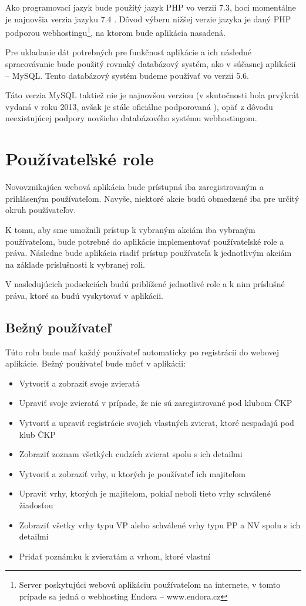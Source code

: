 Ako programovací jazyk bude použítý jazyk PHP vo verzii 7.3, hoci momentálne je najnovšia verzia jazyku 7.4 \cite{verzie-php}.
Dôvod výberu nižšej verzie jazyka je daný PHP podporou webhostingu\footnote{Server poskytujúci webovú aplikáciu používateľom na internete, v tomto prípade sa jedná o webhosting Endora -- www.endora.cz}, na ktorom bude aplikácia nasadená.

Pre ukladanie dát potrebných pre funkčnosť aplikácie a ich následné spracovávanie bude použitý rovnaký databázový systém, ako v súčasnej aplikácii -- MySQL. Tento databázový systém budeme používať vo verzii 5.6.

Táto verzia MySQL taktiež nie je najnovšou verziou (v skutočnosti bola prvýkrát vydaná v roku 2013, avšak je stále oficiálne podporovaná \cite{verzie-mysql}), opäť z dôvodu neexistujúcej podpory novšieho databázového systému webhostingom.

\pagebreak

\section{Používateľské role}\label{pouzivatelske-role}
Novovznikajúca webová aplikácia bude prístupná iba zaregistrovaným a prihláseným používateľom. Navyše, niektoré akcie budú obmedzené iba pre určitý okruh používateľov.

K tomu, aby sme umožnili prístup k vybraným akciám iba vybraným používateľom, bude potrebné do aplikácie implementovať používateľské role a práva. Následne bude aplikácia riadiť prístup používateľa k jednotlivým akciám na základe príslušnosti k vybranej roli.

V nasledujúcich podsekciách budú priblížené jednotlivé role a k nim príslušné práva, ktoré sa budú vyskytovať v aplikácii.

\subsection{Bežný používateľ}\label{bezny-pouzivatel}
Túto rolu bude mať každý používateľ automaticky po registrácii do webovej aplikácie. Bežný používateľ bude môcť v aplikácii: 

\begin{itemize}
	\item Vytvoriť a zobraziť svoje zvieratá
	\item Upraviť svoje zvieratá v prípade, že nie sú zaregistrované pod klubom ČKP
	\item Vytvoriť a upraviť registrácie svojich vlastných zvierat, ktoré nespadajú pod klub ČKP
	\item Zobraziť zoznam všetkých cudzích zvierat spolu s ich detailmi
	\item Vytvoriť a zobraziť vrhy, u ktorých je používateľ ich majiteľom
	\item Upraviť vrhy, ktorých je majitelom, pokiaľ neboli tieto vrhy schválené žiadosťou
	\item Zobraziť všetky vrhy typu VP alebo schválené vrhy typu PP a NV spolu s ich detailmi
	\item Pridať poznámku k zvieratám a vrhom, ktoré vlastní
\end{itemize}

